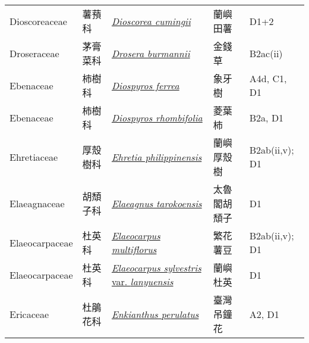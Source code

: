 {\begin{longtable}{p{2.5cm}p{2cm}p{5cm}p{2.5cm}p{3cm}}
    Dioscoreaceae & 薯蕷科 & \href{http://www.theplantlist.org/tpl1.1/search?q=Dioscorea+cumingii}{\textit{Dioscorea cumingii} } & 蘭嶼田薯 & D1+2 \index{Dioscorea@\textit{Dioscorea}!cumingii@\textit{cumingii}}  \index{蘭嶼田薯} \\
    Droseraceae & 茅膏菜科 & \href{http://www.theplantlist.org/tpl1.1/search?q=Drosera+burmannii}{\textit{Drosera burmannii} } & 金錢草 & B2ac(ii) \index{Drosera@\textit{Drosera}!burmannii@\textit{burmannii}}  \index{金錢草} \\
    Ebenaceae & 柿樹科 & \href{http://www.theplantlist.org/tpl1.1/search?q=Diospyros+ferrea}{\textit{Diospyros ferrea} } & 象牙樹 & A4d, C1, D1 \index{Diospyros@\textit{Diospyros}!ferrea@\textit{ferrea}}  \index{象牙樹} \\
    Ebenaceae & 柿樹科 & \href{http://www.theplantlist.org/tpl1.1/search?q=Diospyros+rhombifolia}{\textit{Diospyros rhombifolia} } & 菱葉柿 & B2a, D1 \index{Diospyros@\textit{Diospyros}!rhombifolia@\textit{rhombifolia}}  \index{菱葉柿} \\
    Ehretiaceae & 厚殼樹科 & \href{http://www.theplantlist.org/tpl1.1/search?q=Ehretia+philippinensis}{\textit{Ehretia philippinensis} } & 蘭嶼厚殼樹 & B2ab(ii,v); D1 \index{Ehretia@\textit{Ehretia}!philippinensis@\textit{philippinensis}}  \index{蘭嶼厚殼樹} \\
    Elaeagnaceae & 胡頹子科 & \href{http://www.theplantlist.org/tpl1.1/search?q=Elaeagnus+tarokoensis}{\textit{Elaeagnus tarokoensis} } & 太魯閣胡頹子 & D1 \index{Elaeagnus@\textit{Elaeagnus}!tarokoensis@\textit{tarokoensis}}  \index{太魯閣胡頹子} \\
    Elaeocarpaceae & 杜英科 & \href{http://www.theplantlist.org/tpl1.1/search?q=Elaeocarpus+multiflorus}{\textit{Elaeocarpus multiflorus} } & 繁花薯豆 & B2ab(ii,v); D1 \index{Elaeocarpus@\textit{Elaeocarpus}!multiflorus@\textit{multiflorus}}  \index{繁花薯豆} \\
    Elaeocarpaceae & 杜英科 & \href{http://www.theplantlist.org/tpl1.1/search?q=Elaeocarpus+sylvestris+var.+lanyuensis}{\textit{Elaeocarpus sylvestris} var. \textit{lanyuensis} } & 蘭嶼杜英 & D1 \index{Elaeocarpus@\textit{Elaeocarpus}!sylvestris@\textit{sylvestris}!var. lanyuensis@var. \textit{lanyuensis}}  \index{蘭嶼杜英} \\
    Ericaceae & 杜鵑花科 & \href{http://www.theplantlist.org/tpl1.1/search?q=Enkianthus+perulatus}{\textit{Enkianthus perulatus} } & 臺灣吊鐘花 & A2, D1 \index{Enkianthus@\textit{Enkianthus}!perulatus@\textit{perulatus}}  \index{臺灣吊鐘花} \\

\end{longtable}}
